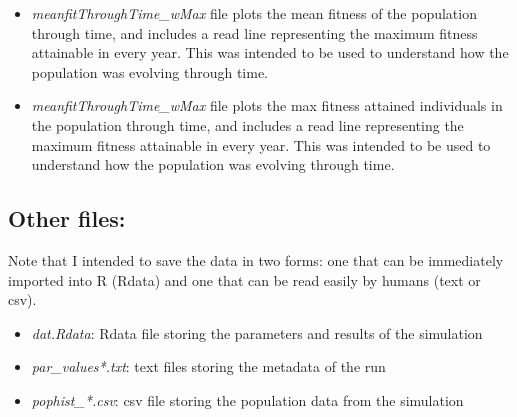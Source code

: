 \documentclass[11pt,a4paper]{article}
\begin{document}
\begin{itemize}
\item \textit{meanfitThroughTime\_wMax} file plots the mean fitness of the population through time, and includes a read line representing the maximum fitness attainable in every year. This was intended to be used to understand how the population was evolving through time.
\item \textit{meanfitThroughTime\_wMax} file plots the max fitness attained individuals in the population through time, and includes a read line representing the maximum fitness attainable in every year. This was intended to be used to understand how the population was evolving through time.
\end{itemize}
\subsection{Other files:}
Note that I intended to save the data in two forms: one that can be immediately imported into R (Rdata) and one that can be read easily by humans (text or csv).
\begin{itemize}
  \item \textit{dat.Rdata}: Rdata file storing the parameters and results of the simulation
  \item \textit{par\_values*.txt}: text files storing the metadata of the run
  \item \textit{pophist\_*.csv}: csv file storing the population data from the simulation
\end{itemize}
\end{document}
